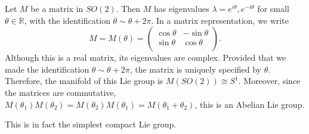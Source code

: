 \begin{example}[$SO(2)$]
  Let $M$ be a matrix in $SO(2)$. Then $M$ has eigenvalues $\lambda = e^{i\theta}, e^{-i\theta}$ for small $\theta \in \mathbb{R}$, with the identification $\theta \sim \theta + 2\pi$.
  In a matrix representation, we write
  \begin{equation}
    M = M(\theta) = 
    \begin{pmatrix}
     \cos\theta & -\sin\theta \\
     \sin\theta & \cos\theta \\
    \end{pmatrix}.
  \end{equation}
  Although this is a real matrix, its eigenvalues are complex. Provided that we made the identification $\theta \sim \theta + 2\pi$, the matrix is uniquely specified by $\theta$.
  Therefore, the manifold of this Lie group is $M(SO(2)) \cong S^1$.
  Moreover, since the matrices are commutative, $M(\theta_1) M(\theta_2) = M(\theta_2) M(\theta_1) = M(\theta_1 + \theta_2)$, this is an Abelian Lie group.
\begin{leftbar}
  \begin{remark}
    This is in fact the simplest compact Lie group.
  \end{remark}
\end{leftbar}
\end{example}

